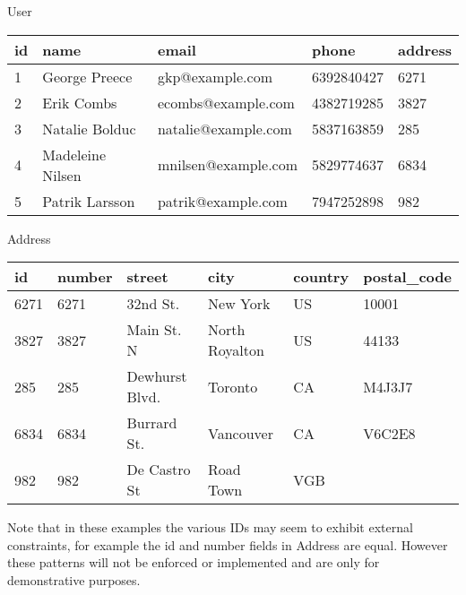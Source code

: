 \documentclass[letterpaper]{report}
\begin{document}
\textsf{User}
\begin{table}[h]
	\begin{tabular}{lllll}
		\textbf{id} & \textbf{name} & \textbf{email} & \textbf{phone} & \textbf{address} \\ \hline
		1 & George Preece & gkp@example.com & 6392840427 & 6271 \\
		2 & Erik Combs & ecombs@example.com & 4382719285 & 3827 \\
		3 & Natalie Bolduc & natalie@example.com & 5837163859 & 285 \\
		4 & Madeleine Nilsen & mnilsen@example.com & 5829774637 & 6834 \\
		5 & Patrik Larsson & patrik@example.com & 7947252898 & 982 \\
	\end{tabular}
\end{table}

\textsf{Address}
\begin{table}[h]
	\begin{tabular}{llllll}
		\textbf{id} & \textbf{number} & \textbf{street} & \textbf{city} & \textbf{country} & \textbf{postal\_code} \\ \hline
		6271 & 6271 & 32nd St. & New York & US & 10001 \\
		3827 & 3827 & Main St. N & North Royalton & US & 44133 \\
		285 & 285 & Dewhurst Blvd. & Toronto & CA & M4J3J7 \\
		6834 & 6834 & Burrard St. & Vancouver & CA & V6C2E8 \\
		982 & 982 & De Castro St & Road Town & VGB & ~ \\
	\end{tabular}
\end{table}

Note that in these examples the various IDs may seem to exhibit external constraints, for example the \textsf{id} and \textsf{number} fields in \textsf{Address} are equal. However these patterns will not be enforced or implemented and are only for demonstrative purposes.
\end{document}
